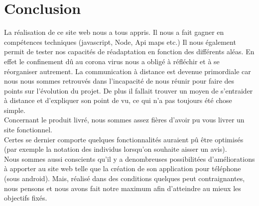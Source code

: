 \documentclass{article}
\begin{document}
\section{Conclusion}
La réalisation de ce site web nous a tous appris. Il nous a fait gagner en compétences techniques (javascript, Node, Api maps etc.) Il nous également permit de tester nos capacités de réadaptation en fonction des différents aléas. En effet le confinement dû au corona virus nous a obligé à réfléchir et à se réorganiser autrement. 
La communication à distance est devenue primordiale car nous nous sommes retrouvés dans l’incapacité de nous réunir pour faire des points sur l’évolution du projet.
De plus il fallait trouver un moyen de s’entraider à distance et d’expliquer son point de vu, ce qui n’a pas toujours été chose simple. \\
Concernant le produit livré, nous sommes assez fières d’avoir pu vous livrer un site fonctionnel. \\
Certes se dernier comporte quelques  fonctionnalités auraient pû être optimisés (par exemple la notation des individus lorsqu'on souhaite aisser un avis). \\
Nous sommes aussi conscients qu'il y a denombreuses possibilitées d’améliorations à apporter au site web telle que la création de son application pour téléphone (sous android). 
Mais, réalisé dans des conditions quelques peut contraignantes, nous pensons et nous avons fait notre maximum afin d’atteindre au mieux les objectifs fixés. \\
\end{document}
